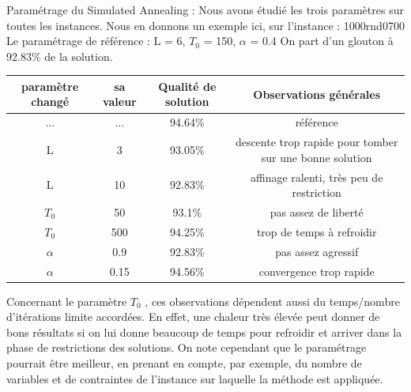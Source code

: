 Paramétrage du Simulated Annealing : Nous avons étudié les trois paramètres sur toutes les instances. Nous en donnons un exemple ici, sur l'instance : 1000rnd0700
Le paramétrage de référence : L = 6, $T_0$ = 150, $\alpha$ = 0.4
On part d'un glouton à 92.83\% de la solution.
\begin{center}
    \begin{tabular}{|c|c|c|c|}  
    \hline
    paramètre changé & sa valeur & Qualité de solution &  Observations générales \\
     \hline
     ... & ...  & 94.64\% & référence\\
     \hline
     L & 3 & 93.05\% & descente trop rapide pour tomber sur une bonne solution\\
     \hline
     L & 10 & 92.83\% & affinage ralenti, très peu de restriction\\
     \hline
     $T_0$ & 50 & 93.1\% & pas assez de liberté\\
     \hline
     $T_0$ & 500 & 94.25\% & trop de temps à refroidir\\
     \hline
     $\alpha$ & 0.9 & 92.83\% & pas assez agressif \\
     \hline
     $\alpha$ & 0.15 & 94.56\% & convergence trop rapide \\     
     \hline
   \end{tabular}
\end{center}

Concernant le paramètre $T_0$ , ces observations dépendent aussi du temps/nombre d'itérations limite accordées. En effet, une chaleur très élevée peut donner de bons résultats si on lui donne beaucoup de temps pour refroidir et arriver dans la phase de restrictions des solutions.
On note cependant que le paramétrage pourrait être meilleur, en prenant en compte, par exemple, du nombre de variables et de contraintes de l'instance sur laquelle la méthode est appliquée.


